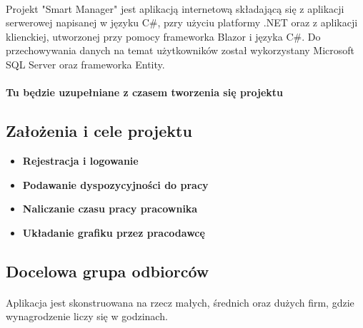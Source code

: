 \documentclass[12pt,a4paper]{article}
\begin{document}
\paragraph{ }Projekt "Smart Manager" jest aplikacją internetową składającą się z aplikacji serwerowej napisanej w języku C\#, pzry użyciu platformy .NET oraz z aplikacji klienckiej, utworzonej przy pomocy frameworka Blazor i języka C\#. Do przechowywania danych na temat użytkowników został wykorzystany Microsoft SQL Server oraz frameworka Entity.
\paragraph{Tu będzie uzupełniane z czasem tworzenia się projektu}
\subsection{Założenia i cele projektu}
\begin{itemize}
    \item \textbf{Rejestracja i logowanie}
    \item \textbf{Podawanie dyspozycyjności do pracy}
    \item \textbf{Naliczanie czasu pracy pracownika}
    \item \textbf{Układanie grafiku przez pracodawcę}
\end{itemize}
\subsection{Docelowa grupa odbiorców}
\paragraph{ }Aplikacja jest skonstruowana na rzecz małych, średnich oraz dużych firm, gdzie wynagrodzenie liczy się w godzinach.

\end{document}
